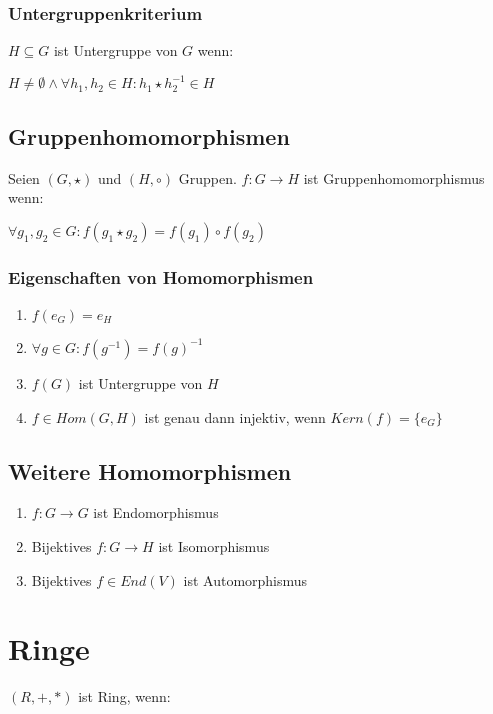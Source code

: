 \subsubsection*{Untergruppenkriterium}

$H \subseteq G$ ist Untergruppe von $G$ wenn:

$H \neq \emptyset \land \forall h_1, h_2 \in H : h_1 \star h_2^{-1} \in H$

\subsection*{Gruppenhomomorphismen}

Seien $(G, \star)$ und $(H, \circ)$ Gruppen. $f: G \rightarrow H$ ist Gruppenhomomorphismus wenn:

$\forall g_1, g_2 \in G: f(g_1 \star g_2) = f(g_1) \circ f(g_2)$

\subsubsection*{Eigenschaften von Homomorphismen}

\begin{enumerate}[label=(\alph*)]
	\item $f(e_G) = e_H$
	\item $\forall g \in G : f(g^{-1}) = f(g)^{-1}$
	\item $f(G)$ ist Untergruppe von $H$
	\item $f \in Hom(G, H)$ ist genau dann injektiv, wenn $Kern(f) = \{e_G\}$
\end{enumerate}

\subsection*{Weitere Homomorphismen}

\begin{enumerate}[label=(\alph*)]
	\item $f : G \rightarrow G$ ist Endomorphismus
	\item Bijektives $f: G \rightarrow H$ ist Isomorphismus
	\item Bijektives $f \in End(V)$ ist Automorphismus
\end{enumerate}

\section*{Ringe}

$(R, +, *)$ ist Ring, wenn:

